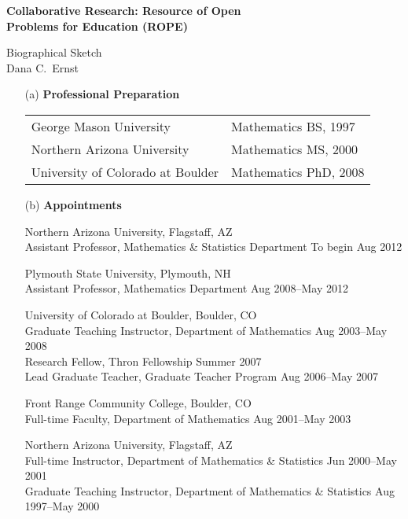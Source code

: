\documentclass[11pt]{article}
\begin{document}
\begin{center}
{\Large \textbf{Collaborative Research: Resource of Open\\
Problems for Education (ROPE)}}

\bigskip

{\Large Biographical Sketch}\\
\smallskip
Dana C.~Ernst
\end{center}

\begin{enumerate}[leftmargin=*]

\item[(a)] \textbf{Professional Preparation}

\begin{tabularx}{6.4in}{@{}XX}
George Mason University  & Mathematics \hfill BS, 1997\\
Northern Arizona University & Mathematics \hfill MS, 2000\\
University of Colorado at Boulder & Mathematics \hfill PhD, 2008
\end{tabularx}

\item[(b)] \textbf{Appointments}

Northern Arizona University, Flagstaff, AZ\\
Assistant Professor, Mathematics \& Statistics Department  \hfill To begin Aug 2012

\smallskip

Plymouth State University, Plymouth, NH\\
Assistant Professor, Mathematics Department  \hfill Aug 2008--May 2012

\smallskip

University of Colorado at Boulder, Boulder, CO\\  
Graduate Teaching Instructor, Department of Mathematics  \hfill Aug 2003--May 2008\\
Research Fellow, Thron Fellowship \hfill Summer 2007\\
Lead Graduate Teacher, Graduate Teacher Program \hfill Aug 2006--May 2007

\smallskip

Front Range Community College, Boulder, CO\\
Full-time Faculty, Department of Mathematics \hfill Aug 2001--May 2003

\smallskip

Northern Arizona University, Flagstaff, AZ\\
Full-time Instructor, Department of Mathematics \& Statistics \hfill Jun 2000--May 2001\\
Graduate Teaching Instructor, Department of Mathematics \& Statistics \hfill Aug 1997--May 2000


\end{enumerate}
\end{document}
